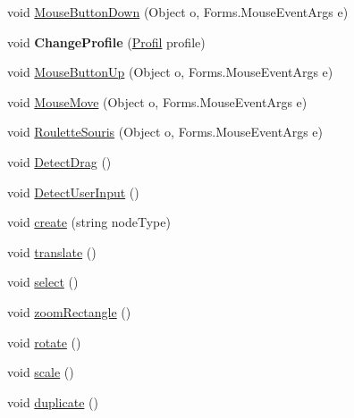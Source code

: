 \begin{DoxyCompactItemize}
\item 
void \hyperlink{class_interface_graphique_1_1_editor_controller_aa934c272adf993f848869161ac86c86f}{Mouse\-Button\-Down} (Object o, Forms.\-Mouse\-Event\-Args e)
\item 
\hypertarget{class_interface_graphique_1_1_editor_controller_a4a6d2bdc7d742e7ba4d1468f40f09365}{void {\bfseries Change\-Profile} (\hyperlink{class_interface_graphique_1_1_profil}{Profil} profile)}\label{class_interface_graphique_1_1_editor_controller_a4a6d2bdc7d742e7ba4d1468f40f09365}

\item 
void \hyperlink{class_interface_graphique_1_1_editor_controller_a12879f41296e60eb88ae423b8540889a}{Mouse\-Button\-Up} (Object o, Forms.\-Mouse\-Event\-Args e)
\item 
void \hyperlink{class_interface_graphique_1_1_editor_controller_a61f00ff89b804b18f701e7d25b912cbc}{Mouse\-Move} (Object o, Forms.\-Mouse\-Event\-Args e)
\item 
void \hyperlink{class_interface_graphique_1_1_editor_controller_a497e7bf59e68d6651649048fb4c31952}{Roulette\-Souris} (Object o, Forms.\-Mouse\-Event\-Args e)
\item 
void \hyperlink{class_interface_graphique_1_1_editor_controller_ac1e015d2cd0a55e076dfcf368e4af5ad}{Detect\-Drag} ()
\item 
void \hyperlink{class_interface_graphique_1_1_editor_controller_a6a822aae7fa981447620045dd2c9ec0d}{Detect\-User\-Input} ()
\item 
void \hyperlink{class_interface_graphique_1_1_editor_controller_a1e71ac2cfc670ff2d239863589123876}{create} (string node\-Type)
\item 
void \hyperlink{class_interface_graphique_1_1_editor_controller_a5a2edbb1d6be9ae097c2c8a2c588d5cc}{translate} ()
\item 
void \hyperlink{class_interface_graphique_1_1_editor_controller_a89ccf4671fc741af80c908374c0feedf}{select} ()
\item 
void \hyperlink{class_interface_graphique_1_1_editor_controller_ab0df0ca1c47e3d84033a9c37f40bf1de}{zoom\-Rectangle} ()
\item 
void \hyperlink{class_interface_graphique_1_1_editor_controller_af47230912ff563ebdd7227344a71bbd5}{rotate} ()
\item 
void \hyperlink{class_interface_graphique_1_1_editor_controller_a861a98d3985e846b685bec518ed2cf73}{scale} ()
\item 
void \hyperlink{class_interface_graphique_1_1_editor_controller_aa171e0b5ea76131c868b12a6adc63cce}{duplicate} ()

\end{DoxyCompactItemize}
